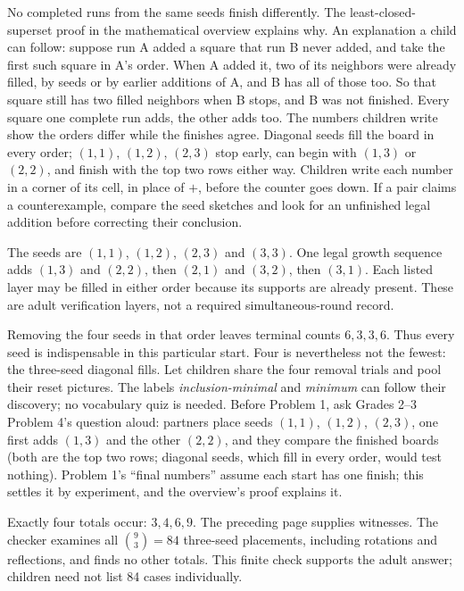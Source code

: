 No completed runs from the same seeds finish differently. The least-closed-superset proof in the mathematical overview explains why. An explanation a child can follow: suppose run A added a square that run B never added, and take the first such square in A's order. When A added it, two of its neighbors were already filled, by seeds or by earlier additions of A, and B has all of those too. So that square still has two filled neighbors when B stops, and B was not finished. Every square one complete run adds, the other adds too. The numbers children write show the orders differ while the finishes agree. Diagonal seeds fill the board in every order; $(1,1)$, $(1,2)$, $(2,3)$ stop early, can begin with $(1,3)$ or $(2,2)$, and finish with the top two rows either way. Children write each number in a corner of its cell, in place of $+$, before the counter goes down. If a pair claims a counterexample, compare the seed sketches and look for an unfinished legal addition before correcting their conclusion.

The seeds are $(1,1)$, $(1,2)$, $(2,3)$ and $(3,3)$. One legal growth sequence adds $(1,3)$ and $(2,2)$, then $(2,1)$ and $(3,2)$, then $(3,1)$. Each listed layer may be filled in either order because its supports are already present. These are adult verification layers, not a required simultaneous-round record.

Removing the four seeds in that order leaves terminal counts $6,3,3,6$. Thus every seed is indispensable in this particular start. Four is nevertheless not the fewest: the three-seed diagonal fills. Let children share the four removal trials and pool their reset pictures. The labels \emph{inclusion-minimal} and \emph{minimum} can follow their discovery; no vocabulary quiz is needed.
Before Problem 1, ask Grades 2--3 Problem 4's question aloud: partners place seeds $(1,1)$, $(1,2)$, $(2,3)$, one first adds $(1,3)$ and the other $(2,2)$, and they compare the finished boards (both are the top two rows; diagonal seeds, which fill in every order, would test nothing). Problem 1's ``final numbers'' assume each start has one finish; this settles it by experiment, and the overview's proof explains it.

Exactly four totals occur: $3,4,6,9$. The preceding page supplies witnesses. The checker examines all $\binom93=84$ three-seed placements, including rotations and reflections, and finds no other totals. This finite check supports the adult answer; children need not list 84 cases individually.

